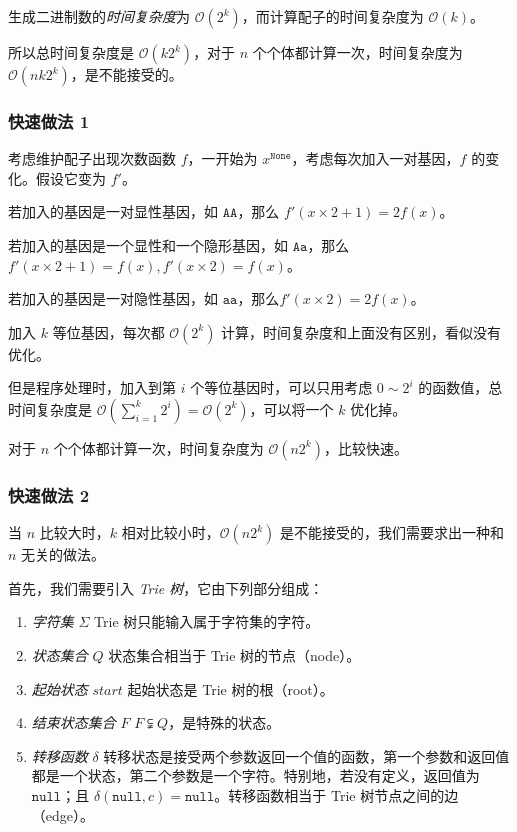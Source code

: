 \documentclass[12pt]{article} %
\begin{document}
生成二进制数的\textsl{时间复杂度}为 $\mathcal O(2^k)$，而计算配子的时间复杂度为 $\mathcal O(k)$。

所以总时间复杂度是 $\mathcal O(k 2^k)$，对于 $n$ 个个体都计算一次，时间复杂度为 $\mathcal O(nk 2^k)$，是不能接受的。

\subsubsection*{快速做法 1}

考虑维护配子出现次数函数 $f$，一开始为 $x^{\texttt{None}}$，考虑每次加入一对基因，$f$ 的变化。假设它变为 $f'$。

若加入的基因是一对显性基因，如 $\texttt{AA}$，那么 $f'(x \times 2 + 1)=2f(x)$。

若加入的基因是一个显性和一个隐形基因，如 $\texttt{Aa}$，那么 $f'(x \times 2 + 1)=f(x),f'(x \times 2)=f(x)$。

若加入的基因是一对隐性基因，如 $\texttt{aa}$，那么$f'(x \times 2)=2f(x)$。

加入 $k$ 等位基因，每次都 $\mathcal O(2^k)$ 计算，时间复杂度和上面没有区别，看似没有优化。

但是程序处理时，加入到第 $i$ 个等位基因时，可以只用考虑 $0 \sim 2^i$ 的函数值，总时间复杂度是 $\mathcal O(\sum_{i=1}^k 2^i)=\mathcal O(2^k)$，可以将一个 $k$ 优化掉。

对于 $n$ 个个体都计算一次，时间复杂度为 $\mathcal O(n2^k)$，比较快速。

\newpage

\subsubsection*{快速做法 2}

当 $n$ 比较大时，$k$ 相对比较小时，$\mathcal O(n2^k)$ 是不能接受的，我们需要求出一种和 $n$ 无关的做法。

首先，我们需要引入 \textsl{Trie 树}，它由下列部分组成：

\begin{enumerate}
    \item \textsl{字符集} $\Sigma$ \qquad Trie 树只能输入属于字符集的字符。
    \item \textsl{状态集合} $Q$ \qquad 状态集合相当于 Trie 树的节点（node）。
    \item \textsl{起始状态} $start$ \qquad 起始状态是 Trie 树的根（root）。
    \item \textsl{结束状态集合} $F$ \qquad $F \subsetneqq Q$，是特殊的状态。
    \item \textsl{转移函数} $\delta$ \qquad 转移状态是接受两个参数返回一个值的函数，第一个参数和返回值都是一个状态，第二个参数是一个字符。特别地，若没有定义，返回值为 $\texttt{null}$；且 $\delta(\texttt{null},c)=\texttt{null}$。转移函数相当于 Trie 树节点之间的边（edge）。
\end{enumerate}
\end{document}
